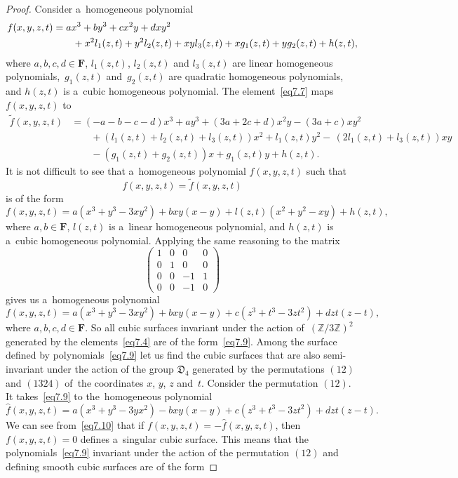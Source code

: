 \documentclass[10pt,a4paper]{amsart}
\begin{document}
\begin{proof}
Consider a~homogeneous polynomial
\begin{align}
\notag
f(x,y,z,t)
&=ax^3+by^3+cx^2y+dxy^2
\\
&\qquad+x^2l_1(z,t)+y^2l_2(z,t)+xyl_3(z,t)+xg_1(z,t)+yg_2(z,t)+h(z,t),
\label{eq7.8}
\end{align}
where $a,b,c,d \in \mathbf{F}$, $l_1(z,t)$, $l_2(z,t)$ and $l_3(z,t)$ are linear homogeneous polynomials,~$g_1(z,t)$ and~$g_2(z,t)$ are quadratic homogeneous polynomials, and $h(z,t)$ is a~cubic homogeneous polynomial. The element~\eqref{eq7.7} maps $f(x,y,z,t)$ to
\begin{align*}
\widetilde{f}(x,y,z,t)
&=(-a-b-c-d)x^3+ay^3+(3a+2c+d)x^2y-(3a+c)xy^2
\\
&\qquad
+(l_1(z,t)+l_2(z,t)+l_3(z,t))x^2+l_1(z,t)y^2{-}\,(2l_1(z,t)+l_3(z,t))xy
\\
&\qquad
-(g_1(z,t)+g_2(z,t))x+g_1(z,t)y+h(z,t).
\end{align*}
It is not difficult to see that a~homogeneous polynomial $f(x,y,z,t)$ such that
$$
f(x,y,z,t)=\widetilde{f}(x,y,z,t)
$$
is of the form
$$
f(x,y,z,t)=a(x^3+y^3-3xy^2)+bxy(x-y)+l(z,t)(x^2+y^2-xy)+h(z,t),
$$
where $a,b \in \mathbf{F}$, $l(z,t)$ is a~linear homogeneous polynomial, and $h(z,t)$ is a~cubic homogeneous polynomial. Applying the same reasoning to the matrix
$$
\begin{pmatrix}
1 & 0 & 0 & 0\\
0 & 1 & 0 & 0\\
0 & 0 & -1 & 1\\
0 & 0 & -1 & 0
\end{pmatrix}
$$
gives us a~homogeneous polynomial
\begin{equation}
\label{eq7.9}
f(x,y,z,t)=a(x^3+y^3-3xy^2)+bxy(x-y)+c(z^3+t^3-3zt^2)+dzt(z-t),
\end{equation}
where $a,b,c,d \in \mathbf{F}$. So all cubic surfaces invariant under the action of~$(\mathbb{Z}/3\mathbb{Z})^2$ generated by the elements~\eqref{eq7.4} are of the form~\eqref{eq7.9}. Among the surface defined by polynomials~\eqref{eq7.9} let us find the cubic surfaces that are also semi-invariant under the action of the group $\mathfrak{D}_4$ generated by the permutations $(12)$ and $(1324)$ of~the coordinates $x$, $y$, $z$ and~$t$. Consider the permutation $(12)$. It takes~\eqref{eq7.9} to the~homogeneous polynomial
\begin{equation}
\label{eq7.10}
\widehat{f}(x,y,z,t)=a(x^3+y^3-3yx^2)-bxy(x-y)+c(z^3+t^3-3zt^2)+dzt(z-t).
\end{equation}
We can see from~\eqref{eq7.10} that if $f(x,y,z,t)=-\widehat{f}(x,y,z,t)$, then $f(x,y,z,t)=0$ defines a~singular cubic surface. This means that the polynomials~\eqref{eq7.9} invariant under the action of the permutation $(12)$ and defining smooth cubic surfaces are of the form

\end{proof}
\end{document}
